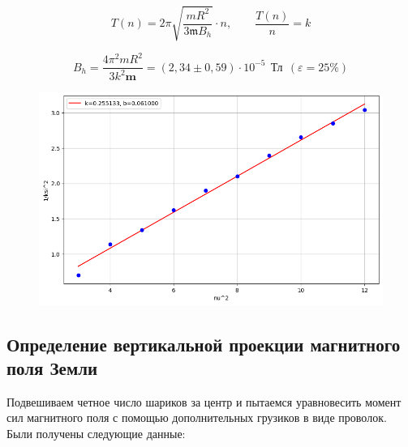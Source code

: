 \documentclass[a4paper, 12pt]{article}
\begin{document}
	\begin{equation*}
		T(n) = 2\pi \sqrt{\frac{mR^2}{3 \mathfrak{m} B_{h}}} \cdot n, \quad \quad \frac{T(n)}{n} = k
	\end{equation*}
	
	\[B_h = \frac{4\pi^2 mR^2}{3k^2\mathbf{m}} = (2,34 \pm 0,59) \cdot 10^{-5} \ \ \text{Тл} \ \ (\varepsilon = 25\%)\]
	
	\begin{figure}[h!]
		\centering
		\includegraphics[width = \textwidth]{pictures/data1.png}
		\caption{}
	\end{figure}
	
	\subsection*{Определение вертикальной проекции магнитного поля Земли}
	Подвешиваем четное число шариков за центр и пытаемся уравновесить момент сил магнитного поля с помощью дополнительных грузиков в виде проволок. Были получены следующие данные:
	
	
	
\end{document}
